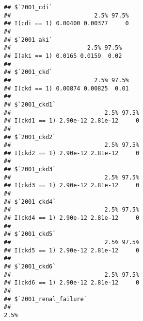 \documentclass[12pt]{ociamthesis}\usepackage[]{graphicx}\usepackage[]{color}
\makeatletter
\newenvironment{kframe}{%
 \def\at@end@of@kframe{}%
 \ifinner\ifhmode%
  \def\at@end@of@kframe{\end{minipage}}%
  \begin{minipage}{\columnwidth}%
 \fi\fi%
 \def\FrameCommand##1{\hskip\@totalleftmargin \hskip-\fboxsep
 \colorbox{shadecolor}{##1}\hskip-\fboxsep
     \hskip-\linewidth \hskip-\@totalleftmargin \hskip\columnwidth}%
 \MakeFramed {\advance\hsize-\width
   \@totalleftmargin\z@ \linewidth\hsize
   \@setminipage}}%
 {\par\unskip\endMakeFramed%
 \at@end@of@kframe}
\newenvironment{knitrout}{}{} %
\makeatother
\begin{document}
\begin{knitrout}
\begin{kframe}
{\ttfamily\noindent\itshape\color{messagecolor}{\#\# Parsed with column specification:\\\#\# cols(\\\#\#\ \  nis\_key = col\_integer(),\\\#\#\ \  nis\_year = col\_integer(),\\\#\#\ \  nis\_stratum = col\_integer(),\\\#\#\ \  age = col\_integer(),\\\#\#\ \  discwt = col\_double(),\\\#\#\ \  hospid = col\_integer(),\\\#\#\ \  renlfail = col\_integer(),\\\#\#\ \  los = col\_integer(),\\\#\#\ \  died = col\_integer(),\\\#\#\ \  cdi = col\_integer(),\\\#\#\ \  aki = col\_integer(),\\\#\#\ \  ckd = col\_integer(),\\\#\#\ \  ckd1 = col\_integer(),\\\#\#\ \  ckd2 = col\_integer(),\\\#\#\ \  ckd3 = col\_integer(),\\\#\#\ \  ckd4 = col\_integer(),\\\#\#\ \  ckd5 = col\_integer(),\\\#\#\ \  ckd6 = col\_integer(),\\\#\#\ \  renal\_failure\_unspecified = col\_integer()\\\#\# )}}\begin{verbatim}
## $`2001_cdi`
##                        2.5% 97.5%
## I(cdi == 1) 0.00400 0.00377     0
## 
## $`2001_aki`
##                      2.5% 97.5%
## I(aki == 1) 0.0165 0.0159  0.02
## 
## $`2001_ckd`
##                        2.5% 97.5%
## I(ckd == 1) 0.00874 0.00825  0.01
## 
## $`2001_ckd1`
##                           2.5% 97.5%
## I(ckd1 == 1) 2.90e-12 2.81e-12     0
## 
## $`2001_ckd2`
##                           2.5% 97.5%
## I(ckd2 == 1) 2.90e-12 2.81e-12     0
## 
## $`2001_ckd3`
##                           2.5% 97.5%
## I(ckd3 == 1) 2.90e-12 2.81e-12     0
## 
## $`2001_ckd4`
##                           2.5% 97.5%
## I(ckd4 == 1) 2.90e-12 2.81e-12     0
## 
## $`2001_ckd5`
##                           2.5% 97.5%
## I(ckd5 == 1) 2.90e-12 2.81e-12     0
## 
## $`2001_ckd6`
##                           2.5% 97.5%
## I(ckd6 == 1) 2.90e-12 2.81e-12     0
## 
## $`2001_renal_failure`
##                                                                     2.5%

\end{verbatim}
\end{kframe}
\end{knitrout}
\end{document}
